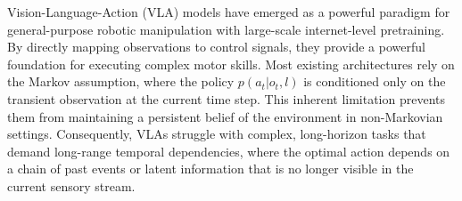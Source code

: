 

Vision-Language-Action (VLA) models have emerged as a powerful paradigm for general-purpose robotic manipulation with large-scale internet-level pretraining. By directly mapping observations to control signals, they provide a powerful foundation for executing complex motor skills. 
Most existing architectures rely on the Markov assumption, where the policy $p(a_t | o_t, l)$ is conditioned only on the transient observation at the current time step. This inherent limitation prevents them from maintaining a persistent belief of the environment in non-Markovian settings. 
Consequently, VLAs struggle with complex, long-horizon tasks that demand long-range temporal dependencies, where the optimal action depends on a chain of past events or latent information that is no longer visible in the current sensory stream.


